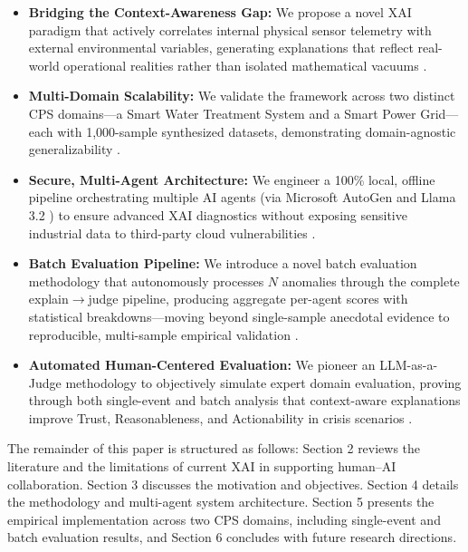 \documentclass[a4paper,fleqn]{cas-dc}
\begin{document}
\begin{itemize}
    \item \textbf{Bridging the Context-Awareness Gap:} We propose a novel XAI paradigm that actively correlates internal physical sensor telemetry with external environmental variables, generating explanations that reflect real-world operational realities rather than isolated mathematical vacuums \cite{ref6, ref7}.
    \item \textbf{Multi-Domain Scalability:} We validate the framework across two distinct CPS domains---a Smart Water Treatment System and a Smart Power Grid---each with 1,000-sample synthesized datasets, demonstrating domain-agnostic generalizability \cite{ref4}.
    \item \textbf{Secure, Multi-Agent Architecture:} We engineer a 100\% local, offline pipeline orchestrating multiple AI agents (via Microsoft AutoGen \cite{ref_autogen} and Llama 3.2 \cite{ref_llama}) to ensure advanced XAI diagnostics without exposing sensitive industrial data to third-party cloud vulnerabilities \cite{ref10}.
    \item \textbf{Batch Evaluation Pipeline:} We introduce a novel batch evaluation methodology that autonomously processes $N$ anomalies through the complete explain$\rightarrow$judge pipeline, producing aggregate per-agent scores with statistical breakdowns---moving beyond single-sample anecdotal evidence to reproducible, multi-sample empirical validation \cite{ref_batch_eval}.
    \item \textbf{Automated Human-Centered Evaluation:} We pioneer an LLM-as-a-Judge methodology \cite{ref_llm_judge} to objectively simulate expert domain evaluation, proving through both single-event and batch analysis that context-aware explanations improve Trust, Reasonableness, and Actionability in crisis scenarios \cite{ref17}.
\end{itemize}

The remainder of this paper is structured as follows: Section 2 reviews the literature and the limitations of current XAI in supporting human--AI collaboration. Section 3 discusses the motivation and objectives. Section 4 details the methodology and multi-agent system architecture. Section 5 presents the empirical implementation across two CPS domains, including single-event and batch evaluation results, and Section 6 concludes with future research directions.

\end{document}
